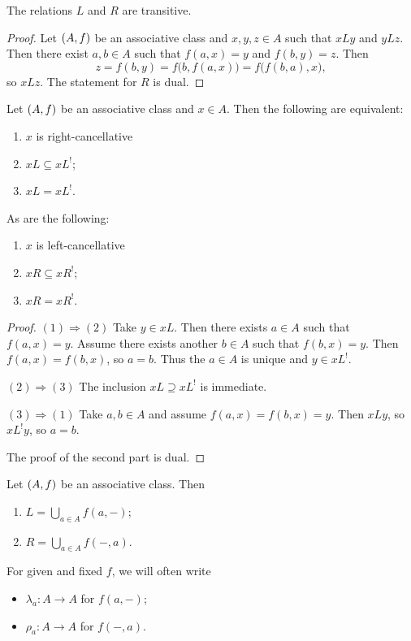 \begin{lemma}
The relations $L$ and $R$ are transitive.
\end{lemma}
\begin{proof}
Let $\left( A, f \right)$ be an associative class and $x, y, z\in A$ such that $xLy$ and $yLz$. Then there exist $a,b\in A$ such that $f(a,x) = y$ and $f(b,y) = z$. Then
\[ z = f(b,y) = f\big(b,f(a,x)\big) = f\big(f(b,a), x\big), \]
so $xLz$. The statement for $R$ is dual.
\end{proof}

\begin{lemma}
Let $\left( A, f \right)$ be an associative class and $x\in A$. Then the following are equivalent:
\begin{enumerate}
\item $x$ is right-cancellative
\item $xL \subseteq xL^!$;
\item $xL = xL^!$.
\end{enumerate}
As are the following:
\begin{enumerate}
\item $x$ is left-cancellative
\item $xR \subseteq xR^!$;
\item $xR = xR^!$.
\end{enumerate}
\end{lemma}
\begin{proof}
$(1) \Rightarrow (2)$ Take $y\in xL$. Then there exists $a\in A$ such that $f(a,x) = y$. Assume there exists another $b\in A$ such that $f(b,x) = y$. Then $f(a,x) = f(b,x)$, so $a=b$. Thus the $a\in A$ is unique and $y\in xL^!$.

$(2) \Rightarrow (3)$ The inclusion $xL \supseteq xL^!$ is immediate.

$(3) \Rightarrow (1)$ Take $a,b\in A$ and assume $f(a,x) = f(b,x) = y$. Then $xLy$, so $xL^!y$, so $a=b$.

The proof of the second part is dual.
\end{proof}

\begin{lemma}
Let $\left( A, f \right)$ be an associative class. Then
\begin{enumerate}
\item $L = \bigcup_{a\in A}f(a, -)$;
\item $R = \bigcup_{a\in A}f(-, a)$.
\end{enumerate}
\end{lemma}

For given and fixed $f$, we will often write
\begin{itemize}
\item $\lambda_a: A\to A$ for $f(a, -)$;
\item $\rho_a: A\to A$ for $f(-, a)$.
\end{itemize}


